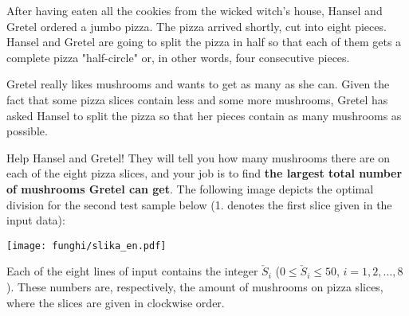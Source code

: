 \renewcommand{\taskname}{FUNGHI}
\renewcommand{\timelimit}{1 second}
\renewcommand{\memorylimit}{32 MB}
\renewcommand{\score}{50 points}

After having eaten all the cookies from the wicked witch's house, Hansel and Gretel ordered a jumbo pizza. The pizza arrived shortly, cut into eight pieces. Hansel and Gretel are going to split the pizza in half so that each of them gets a complete pizza "half-circle" or, in other words, four consecutive pieces.

Gretel really likes mushrooms and wants to get as many as she can. Given the fact that some pizza slices contain less and some more mushrooms, Gretel has asked Hansel to split the pizza so that her pieces contain as many mushrooms as possible.

Help Hansel and Gretel! They will tell you how many mushrooms there are on each of the eight pizza slices, and your job is to find \textbf{the largest total number of mushrooms Gretel can get}. The following image depicts the optimal division for the second test sample below (1. denotes the first slice given in the input data):

\begin{center}
\texttt{[image: funghi/slika\_en.pdf]}
\end{center}

\strut


Each of the eight lines of input contains the integer $\check{S}_i$ ($0 \leqslant \check{S}_i \leqslant 50$, $i = 1, 2, \ldots, 8$). These numbers are, respectively, the amount of mushrooms on pizza slices, where the slices are given in clockwise order.


